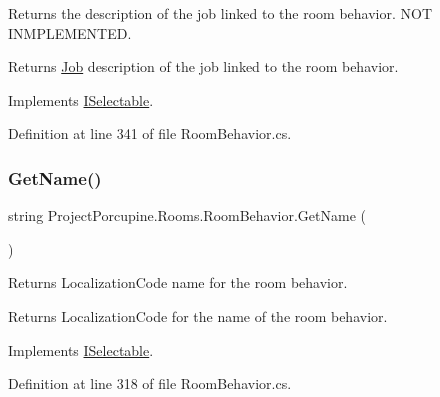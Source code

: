 Returns the description of the job linked to the room behavior. N\+OT I\+N\+M\+P\+L\+E\+M\+E\+N\+T\+ED. 

\begin{DoxyReturn}{Returns}
\hyperlink{class_job}{Job} description of the job linked to the room behavior.
\end{DoxyReturn}


Implements \hyperlink{interface_i_selectable_a4d0f9fa51a3d70a7fbcbb39e126e4c73}{I\+Selectable}.



Definition at line 341 of file Room\+Behavior.\+cs.

\mbox{\label{class_project_porcupine_1_1_rooms_1_1_room_behavior_a1b6f920757fd3485cb0bc59b1101c0fb}} 
\subsubsection{\texorpdfstring{Get\+Name()}{GetName()}}
{\footnotesize\ttfamily string Project\+Porcupine.\+Rooms.\+Room\+Behavior.\+Get\+Name (\begin{DoxyParamCaption}{ }\end{DoxyParamCaption})}



Returns Localization\+Code name for the room behavior. 

\begin{DoxyReturn}{Returns}
Localization\+Code for the name of the room behavior.
\end{DoxyReturn}


Implements \hyperlink{interface_i_selectable_af676ba50e2cd5839438d3092743a79da}{I\+Selectable}.



Definition at line 318 of file Room\+Behavior.\+cs.

\mbox{\label{class_project_porcupine_1_1_rooms_1_1_room_behavior_ab8b0bf8d4a930240e5e9acbdc028bf97}} 
